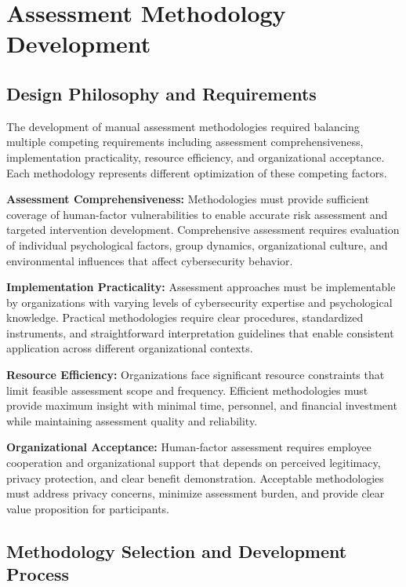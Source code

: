 \documentclass[10pt, twocolumn]{article}
\begin{document}
\section{Assessment Methodology Development}

\subsection{Design Philosophy and Requirements}

The development of manual assessment methodologies required balancing multiple competing requirements including assessment comprehensiveness, implementation practicality, resource efficiency, and organizational acceptance. Each methodology represents different optimization of these competing factors.

\textbf{Assessment Comprehensiveness:} Methodologies must provide sufficient coverage of human-factor vulnerabilities to enable accurate risk assessment and targeted intervention development. Comprehensive assessment requires evaluation of individual psychological factors, group dynamics, organizational culture, and environmental influences that affect cybersecurity behavior.

\textbf{Implementation Practicality:} Assessment approaches must be implementable by organizations with varying levels of cybersecurity expertise and psychological knowledge. Practical methodologies require clear procedures, standardized instruments, and straightforward interpretation guidelines that enable consistent application across different organizational contexts.

\textbf{Resource Efficiency:} Organizations face significant resource constraints that limit feasible assessment scope and frequency. Efficient methodologies must provide maximum insight with minimal time, personnel, and financial investment while maintaining assessment quality and reliability.

\textbf{Organizational Acceptance:} Human-factor assessment requires employee cooperation and organizational support that depends on perceived legitimacy, privacy protection, and clear benefit demonstration. Acceptable methodologies must address privacy concerns, minimize assessment burden, and provide clear value proposition for participants.

\subsection{Methodology Selection and Development Process}
\end{document}
